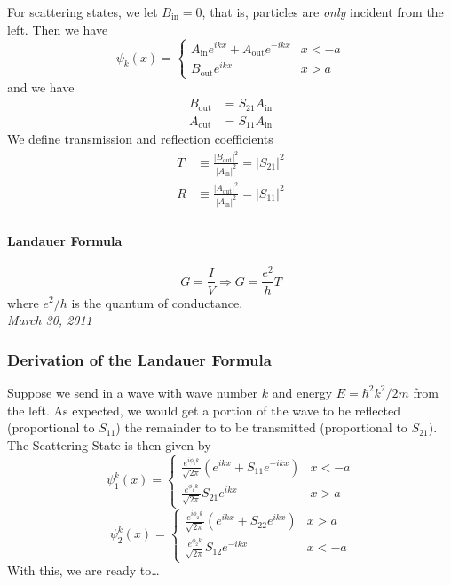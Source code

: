 \documentclass{article}
\begin{document}
			For scattering states, we let $B_{\mathrm{in}}=0$, that is, particles are \emph{only} incident from the left. Then we have
			$$\psi_k(x)=\begin{cases} A_{\mathrm{in}}e^{ikx}+A_{\mathrm{out}}e^{-ikx} & x<-a\\
			B_{\mathrm{out}}e^{ikx} &x>a \end{cases}$$
			and we have
			\begin{align*}
				B_{\mathrm{out}}&=S_{21}A_{\mathrm{in}}\\
				A_{\mathrm{out}}&=S_{11}A_{\mathrm{in}}
			\end{align*}
			We define transmission and reflection coefficients
			\begin{align*}
			T&\equiv \frac{\left|B_{\mathrm{out}}\right|^2}{\left|A_{\mathrm{in}}\right|^2}=\left|S_{21}\right|^2\\
			R&\equiv \frac{\left|A_{\mathrm{out}}\right|^2}{\left|A_{\mathrm{in}}\right|^2}=\left|S_{11}\right|^2\\
			\end{align*}
			\paragraph{Landauer Formula}
			$$G=\frac{I}{V}\Rightarrow G=\frac{e^2}{h}T$$
			where $e^2/h$ is the quantum of conductance.\\
			
			\noindent \textit{March 30, 2011}
			\subsubsection*{Derivation of the Landauer Formula}
			Suppose we send in a wave with wave number $k$ and energy $E=\hbar^2k^2/2m$ from the left. As expected, we would get a portion of the wave to be reflected (proportional to $S_{11}$) the remainder to to be transmitted (proportional to $S_{21}$).	\\		
			
			\noindent The Scattering State is then given by
			$$\psi_{1}^k(x)=\begin{cases} \frac{e^{i\phi_1 k}}{\sqrt{2\pi}}\left(e^{ikx}+S_{11}e^{-ikx}\right) & x<-a\\
			\frac{e^{\phi_1k}}{\sqrt{2\pi}}S_{21}e^{ikx} & x>a \end{cases}$$
			$$\psi_2^k(x)=\begin{cases} \frac{e^{i\phi_2 k}}{\sqrt{2\pi}}\left(e^{ikx}+S_{22}e^{ikx}\right) & x>a\\
			\frac{e^{\phi_2k}}{\sqrt{2\pi}}S_{12}e^{-ikx} & x<-a \end{cases}$$
			With this, we are ready to\ldots\\
			
\end{document}
